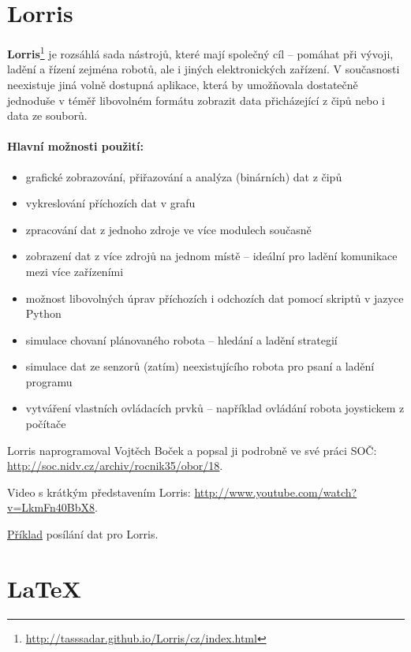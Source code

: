  
 \section{Lorris} \label{lorris}
 
 {\bf Lorris}\footnote{\url{http://tasssadar.github.io/Lorris/cz/index.html}}  je rozsáhlá sada nástrojů, které mají společný cíl -- pomáhat při vývoji, ladění a řízení zejména robotů, ale i jiných elektronických zařízení. V současnosti neexistuje jiná volně dostupná aplikace, která by umožňovala dostatečně jednoduše v téměř libovolném formátu zobrazit data přicházející z čipů nebo i data ze souborů. 
 
\paragraph{ Hlavní možnosti použití: }

\begin{itemize}
	\item grafické zobrazování, přiřazování a analýza (binárních) dat z čipů
	\item vykreslování příchozích dat v grafu 
	\item zpracování dat z jednoho zdroje ve více modulech současně
	\item zobrazení dat z více zdrojů na jednom místě -- ideální pro ladění komunikace mezi více zařízeními 
	\item možnost libovolných úprav příchozích i odchozích dat pomocí skriptů v jazyce Python 
	\item simulace chovaní plánovaného robota -- hledání a ladění strategií
	\item simulace dat ze senzorů (zatím) neexistujícího robota pro psaní a ladění programu 
	\item vytváření vlastních ovládacích prvků -- například ovládání robota joystickem z počítače 
	\end{itemize}

 Lorris naprogramoval Vojtěch Boček a popsal ji podrobně ve své práci SOČ:
  \url{http://soc.nidv.cz/archiv/rocnik35/obor/18}.
  
 Video s krátkým představením Lorris: \url{http://www.youtube.com/watch?v=LkmFn40BbX8}.
 
  \hyperref[prog:lorris]{Příklad} posílání dat pro Lorris.
 
\section{\LaTeX} 

